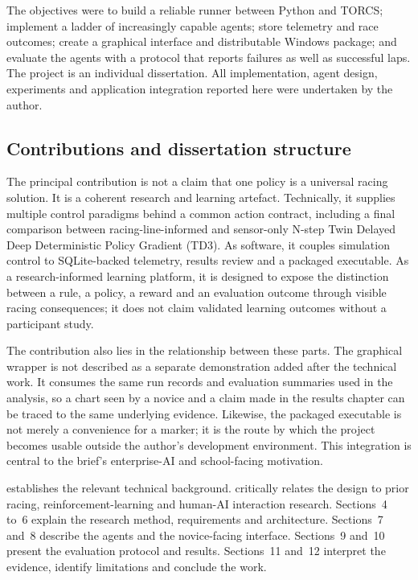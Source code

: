 The objectives were to build a reliable runner between Python and TORCS; implement a ladder of increasingly capable agents; store telemetry and race outcomes; create a graphical interface and distributable Windows package; and evaluate the agents with a protocol that reports failures as well as successful laps. The project is an individual dissertation. All implementation, agent design, experiments and application integration reported here were undertaken by the author.

\subsection{Contributions and dissertation structure}

The principal contribution is not a claim that one policy is a universal racing solution. It is a coherent research and learning artefact. Technically, it supplies multiple control paradigms behind a common action contract, including a final comparison between racing-line-informed and sensor-only N-step Twin Delayed Deep Deterministic Policy Gradient (TD3). As software, it couples simulation control to SQLite-backed telemetry, results review and a packaged executable. As a research-informed learning platform, it is designed to expose the distinction between a rule, a policy, a reward and an evaluation outcome through visible racing consequences; it does not claim validated learning outcomes without a participant study.

The contribution also lies in the relationship between these parts. The graphical wrapper is not described as a separate demonstration added after the technical work. It consumes the same run records and evaluation summaries used in the analysis, so a chart seen by a novice and a claim made in the results chapter can be traced to the same underlying evidence. Likewise, the packaged executable is not merely a convenience for a marker; it is the route by which the project becomes usable outside the author's development environment. This integration is central to the brief's enterprise-AI and school-facing motivation.

 establishes the relevant technical background.  critically relates the design to prior racing, reinforcement-learning and human-AI interaction research. Sections~4 to~6 explain the research method, requirements and architecture. Sections~7 and~8 describe the agents and the novice-facing interface. Sections~9 and~10 present the evaluation protocol and results. Sections~11 and~12 interpret the evidence, identify limitations and conclude the work.


